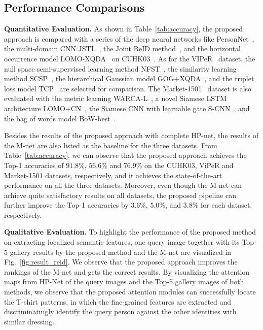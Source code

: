 \documentclass[10pt,twocolumn,letterpaper]{article}
\begin{document}
\subsection{Performance Comparisons}

\noindent\textbf{Quantitative Evaluation.}
As shown in Table~\ref{tab:accuracy}, the proposed approach is compared with a series of the deep neural networks like PersonNet~\cite{wu2016personnet}, the multi-domain CNN JSTL~\cite{xiao2016learning},
the Joint ReID method~\cite{ahmed2015improved}, and the horizontal occurrence model LOMO-XQDA~\cite{liao2015person} on CUHK03~\cite{li2014deepreid}.
As for the VIPeR~\cite{gray2007evaluating} dataset, the null space semi-supervised learning method NFST~\cite{zhang2016learning}, the similarity learning method SCSP~\cite{chen2016similarity}, the hierarchical Gaussian model GOG+XQDA~\cite{matsukawa2016hierarchical},
and the triplet loss model TCP~\cite{cheng2016person} are selected for comparison.
The Market-1501~\cite{zheng2015scalable} dataset is also evaluated with the metric learning WARCA-L~\cite{jose2016scalable}, a novel Siamese LSTM architecture LOMO+CN~\cite{varior2016siamese}, the Siamese CNN with learnable gate S-CNN~\cite{varior2016gated},
and the bag of words model BoW-best~\cite{zheng2015scalable}.

Besides the results of the proposed approach with complete HP-net, the results of the M-net are also listed as the baseline for the three datasets.
From Table~\ref{tab:accuracy}, we can observe that the proposed approach achieves the Top-1 accuracies of $91.8\%$, $56.6\%$ and $76.9\%$ on the CUHK03, ViPeR and Market-1501 datasets, respectively, and it achieves the state-of-the-art performance on all the three datasets.
Moreover, even though the M-net can achieve quite satisfactory results on all datasets, the proposed pipeline can further improve the Top-1 accuracies by $3.6\%$, $5.0\%$, and $3.8\%$ for each dataset, respectively.


\vspace{+0.1cm}
\noindent\textbf{Qualitative Evaluation.}
To highlight the performance of the proposed method on extracting localized semantic features, one query image together with its Top-5 gallery results by the proposed method and the M-net are visualized in Fig.~\ref{fig:result_reid}.
We observe that the proposed approach improves the rankings of the M-net and gets the correct results.
By visualizing the attention maps from HP-Net of the query images and the Top-5 gallery images of both methods, we observe that the proposed attention modules can successfully locate the T-shirt patterns, in which the fine-grained features are extracted and discriminatingly identify the query person against the other identities with similar dressing.
\
\end{document}
